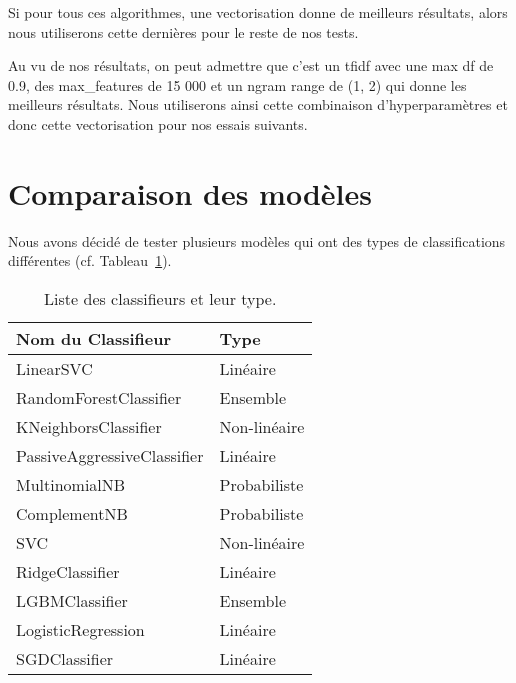 \documentclass[11pt]{article}
\begin{document}
Si pour tous ces algorithmes, une vectorisation donne de meilleurs résultats, alors nous utiliserons cette dernières pour le reste de nos tests.

Au vu de nos résultats, on peut admettre que c'est un tfidf avec une max df de 0.9, des max\_features de 15 000 et un ngram range de (1, 2) qui donne les meilleurs résultats. Nous utiliserons ainsi cette combinaison d'hyperparamètres et donc cette vectorisation pour nos essais suivants.

\section{Comparaison des modèles}
Nous avons décidé de tester plusieurs modèles qui ont des types de classifications différentes (cf. Tableau~\ref{tab:classifieurs_types}).

\begin{table}[h]
    \centering
    \begin{tabular}{|l|l|}
        \hline
        \textbf{Nom du Classifieur}        & \textbf{Type} \\ \hline
        LinearSVC                         & Linéaire      \\ \hline
        RandomForestClassifier            & Ensemble      \\ \hline
        KNeighborsClassifier              & Non-linéaire  \\ \hline
        PassiveAggressiveClassifier       & Linéaire      \\ \hline
        MultinomialNB                     & Probabiliste  \\ \hline
        ComplementNB                      & Probabiliste  \\ \hline
        SVC                               & Non-linéaire  \\ \hline
        RidgeClassifier                   & Linéaire      \\ \hline
        LGBMClassifier                    & Ensemble      \\ \hline
        LogisticRegression                & Linéaire      \\ \hline
        SGDClassifier                     & Linéaire      \\ \hline
    \end{tabular}
    \caption{Liste des classifieurs et leur type.}
    \label{tab:classifieurs_types} %
\end{table}
\end{document}
